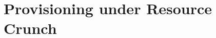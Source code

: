 \documentclass[journal]{IEEEtran}
\begin{document}
\section{Provisioning under Resource Crunch} \label{sec:cag-and-alg}


\end{document}
